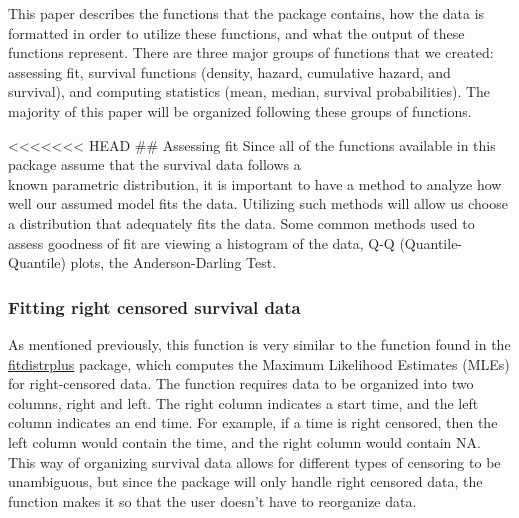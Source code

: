 This paper describes the functions that the  package
contains, how the data is formatted in order to utilize these functions,
and what the output of these functions represent. There are three major
groups of functions that we created: assessing fit, survival functions
(density, hazard, cumulative hazard, and survival), and computing
statistics (mean, median, survival probabilities). The majority of this
paper will be organized following these groups of functions.

\textless{}\textless{}\textless{}\textless{}\textless{}\textless{}\textless{}
HEAD \#\# Assessing fit Since all of the functions available in this
package assume that the survival data follows a\\
known parametric distribution, it is important to have a method to
analyze how well our assumed model fits the data. Utilizing such methods
will allow us choose a distribution that adequately fits the data. Some
common methods used to assess goodness of fit are viewing a histogram of
the data, Q-Q (Quantile-Quantile) plots, the Anderson-Darling Test.

\hypertarget{fitting-right-censored-survival-data}{%
\subsubsection{Fitting right censored survival
data}\label{fitting-right-censored-survival-data}}

As mentioned previously, this function is very similar to the function
 found in the
\href{https://cran.r-project.org/web/packages/fitdistrplus/index.html}{fitdistrplus}
package, which computes the Maximum Likelihood Estimates (MLEs) for
right-censored data. The  function requires data to be
organized into two columns, right and left. The right column indicates a
start time, and the left column indicates an end time. For example, if a
time is right censored, then the left column would contain the time, and
the right column would contain NA. This way of organizing survival data
allows for different types of censoring to be unambiguous, but since the
 package will only handle right censored data, the
 function makes it so that the user doesn't have to
reorganize data.

